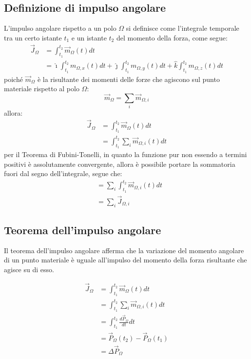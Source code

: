 \documentclass[11pt, a4paper, openright]{book}
\theoremstyle{plain}
\theoremstyle{definition}
\begin{document}
\subsection{Definizione di impulso angolare}
L'impulso angolare rispetto a un polo $\Omega$ si definisce come l'integrale temporale tra un certo istante $t_1$ e un istante $t_2$ del momento della forza, come segue:
\begin{align}
    \vec{J}_\Omega & = \int_{t_1}^{t_2} \vec{m}_\Omega(t)dt \\
                   & = \hat{\imath}\int_{t_1}^{t_2} m_{\Omega,x}(t)dt + \hat{\jmath}\int_{t_1}^{t_2} m_{\Omega,y}(t)dt + \hat{k}\int_{t_1}^{t_2} m_{\Omega,z}(t)dt 
\end{align}
poiché $\vec{m}_\Omega$ è la risultante dei momenti delle forze che agiscono sul punto materiale rispetto al polo $\Omega$:
\[\vec{m}_\Omega = \sum_i \vec{m}_{\Omega,i}\]
allora:
\begin{align}
    \vec{J}_\Omega & = \int_{t_1}^{t_2} \vec{m}_\Omega(t)dt \\
    & = \int_{t_1}^{t_2} \sum_i\vec{m}_{\Omega,i}(t)dt
\end{align}
per il Teorema di Fubini-Tonelli, in quanto la funzione pur non essendo a termini positivi è assolutamente convergente, allora è possibile portare la sommatoria fuori dal segno dell'integrale, segue che:
\begin{align}
    & = \sum_i\int_{t_1}^{t_2} \vec{m}_{\Omega,i}(t)dt \\
    & = \sum_i \vec{J}_{\Omega,i}
\end{align}

\subsection{Teorema dell'impulso angolare}
Il teorema dell'impulso angolare afferma che la variazione del momento angolare di un punto materiale è uguale all'impulso del momento della forza risultante che agisce su di esso.

\begin{align}
    \vec{J}_\Omega & = \int_{t_1}^{t_2} \vec{m}_\Omega(t)dt \\
    & = \int_{t_1}^{t_2} \sum_i\vec{m}_{\Omega,i}(t)dt \\
    & = \int_{t_1}^{t_2} \frac{d\vec{P}_\Omega}{dt}dt \\
    & = \vec{P}_\Omega(t_2) - \vec{P}_\Omega(t_1) \\
    & = \Delta\vec{P}_\Omega
\end{align}
\end{document}

